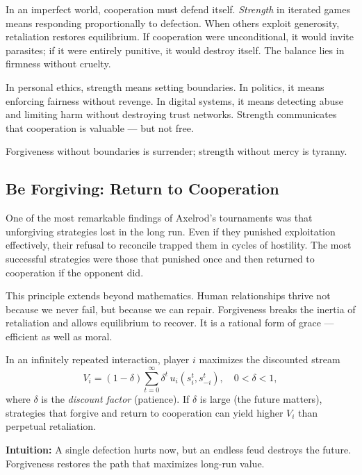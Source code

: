 \documentclass[12pt,twoside]{book}
\begin{document}
In an imperfect world, cooperation must defend itself.  
\emph{Strength} in iterated games means responding proportionally to defection.  
When others exploit generosity, retaliation restores equilibrium.  
If cooperation were unconditional, it would invite parasites; if it were entirely punitive, it would destroy itself.  
The balance lies in firmness without cruelty.

In personal ethics, strength means setting boundaries.  
In politics, it means enforcing fairness without revenge.  
In digital systems, it means detecting abuse and limiting harm without destroying trust networks.  
Strength communicates that cooperation is valuable --- but not free.\\

\begin{keyidea}
Forgiveness without boundaries is surrender; strength without mercy is tyranny.
\end{keyidea}

\subsection*{Be Forgiving: Return to Cooperation}

One of the most remarkable findings of Axelrod’s tournaments was that unforgiving strategies lost in the long run.  
Even if they punished exploitation effectively, their refusal to reconcile trapped them in cycles of hostility.  
The most successful strategies were those that punished once and then returned to cooperation if the opponent did.  

This principle extends beyond mathematics.  
Human relationships thrive not because we never fail, but because we can repair.  
Forgiveness breaks the inertia of retaliation and allows equilibrium to recover.  
It is a rational form of grace --- efficient as well as moral.  

\begin{tcolorbox}[colback=gray!5,colframe=gray!60,boxrule=0.4pt,arc=1mm,
title=Mathematical Interlude: Discounting the Future in Iterated Games]

In an infinitely repeated interaction, player $i$ maximizes the discounted stream
\[
V_i=(1-\delta)\sum_{t=0}^{\infty}\delta^{t}\,u_i(s_i^t,s_{-i}^t),
\quad 0<\delta<1,
\]
where $\delta$ is the \emph{discount factor} (patience).  
If $\delta$ is large (the future matters), strategies that forgive and return to cooperation can yield higher $V_i$ than perpetual retaliation.

\textbf{Intuition:} A single defection hurts now, but an endless feud destroys the future. Forgiveness restores the path that maximizes long-run value.
\end{tcolorbox}
\end{document}
